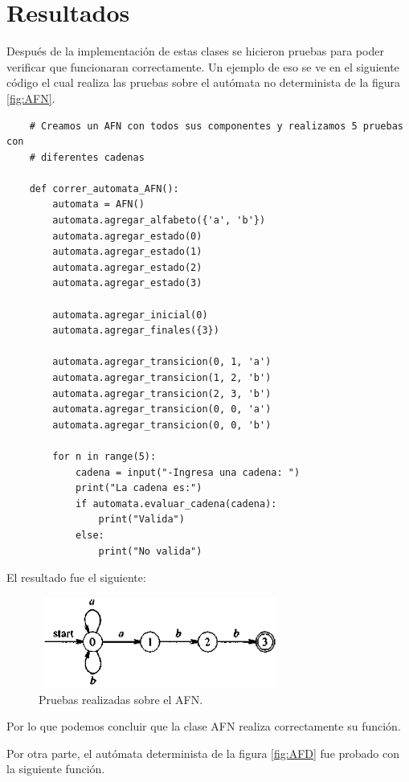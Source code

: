 \documentclass[titlepage]{article}
\begin{document}
	\section{Resultados}
	Después de la implementación de estas clases se hicieron pruebas para poder verificar que funcionaran correctamente. Un ejemplo de eso se ve en el siguiente código el cual realiza las pruebas sobre el autómata no determinista de la figura \ref{fig:AFN}.
	
	\begin{lstlisting}
	# Creamos un AFN con todos sus componentes y realizamos 5 pruebas con
	# diferentes cadenas
	
	def correr_automata_AFN():
		automata = AFN()
		automata.agregar_alfabeto({'a', 'b'})
		automata.agregar_estado(0)
		automata.agregar_estado(1)
		automata.agregar_estado(2)
		automata.agregar_estado(3)
		
		automata.agregar_inicial(0)
		automata.agregar_finales({3})
		
		automata.agregar_transicion(0, 1, 'a')
		automata.agregar_transicion(1, 2, 'b')
		automata.agregar_transicion(2, 3, 'b')
		automata.agregar_transicion(0, 0, 'a')
		automata.agregar_transicion(0, 0, 'b')
		
		for n in range(5):
			cadena = input("-Ingresa una cadena: ")
			print("La cadena es:")
			if automata.evaluar_cadena(cadena):
				print("Valida")
			else:
				print("No valida")
	\end{lstlisting}
	
	El resultado fue el siguiente:
	
	\begin{figure}[H]
		\begin{center}
			\includegraphics[width=8cm, height=3cm]{AFN.png}
			\caption{Pruebas realizadas sobre el AFN.}
			\label{fig:AFN2}
		\end{center}
	\end{figure}
	
	Por lo que podemos concluir que la clase AFN realiza correctamente su función.
	
	Por otra parte, el autómata determinista de la figura \ref{fig:AFD} fue probado con la siguiente función.
	
\end{document}
